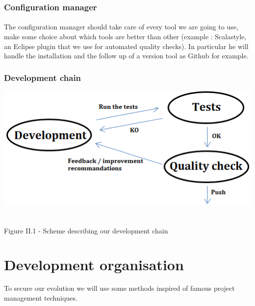 \documentclass{report}
\begin{document}
\subsubsection{Configuration manager}

\paragraph{}
\hspace{4mm}\textnormal{The configuration manager should take care of every tool we are going to use, make some choice about which tools are better than other (example :
Scalastyle, an Eclipse plugin that we use for automated quality checks).
In particular he will handle the installation and the follow up of a version tool as Github for example.}

\subsubsection{Development chain}

\begin{center}
\includegraphics[scale=0.7]{data/cycle_qualite}
~\\~\\Figure II.1 - Scheme describing our development chain
\end{center}

\section{Development organisation}

\paragraph{}
\hspace{4mm}\textnormal{To secure our evolution we will use some methods inspired of famous project management techniques.}
\end{document}
